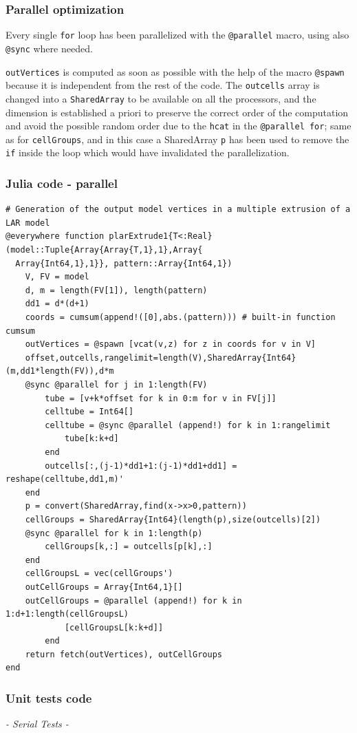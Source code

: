 \documentclass[a4paper,12pt,titlepage]{article}					%
\begin{document}
\subsubsection{Parallel optimization}
Every single \texttt{for} loop has been parallelized with the \texttt{@parallel} macro, using also \texttt{@sync} where needed.

\texttt{outVertices} is computed as soon as possible with the help of the macro \texttt{@spawn} because it is independent from the rest of the code.
The \texttt{outcells} array is changed into a \texttt{SharedArray} to be available on all the processors, and the dimension is established a priori to preserve the correct order of the computation and avoid the possible random order due to the \texttt{hcat} in the \texttt{@parallel for}; same as for \texttt{cellGroups}, and in this case a SharedArray \texttt{p} has been used to remove the \texttt{if} inside the loop which would have invalidated the parallelization.


\subsubsection{Julia code - parallel}
\begin{Verbatim}
# Generation of the output model vertices in a multiple extrusion of a LAR model
@everywhere function plarExtrude1{T<:Real}(model::Tuple{Array{Array{T,1},1},Array{
  Array{Int64,1},1}}, pattern::Array{Int64,1})
	V, FV = model
	d, m = length(FV[1]), length(pattern)
	dd1 = d*(d+1)
	coords = cumsum(append!([0],abs.(pattern))) # built-in function cumsum
	outVertices = @spawn [vcat(v,z) for z in coords for v in V]
	offset,outcells,rangelimit=length(V),SharedArray{Int64}(m,dd1*length(FV)),d*m
	@sync @parallel for j in 1:length(FV)
		tube = [v+k*offset for k in 0:m for v in FV[j]]
		celltube = Int64[]
		celltube = @sync @parallel (append!) for k in 1:rangelimit
			tube[k:k+d]
		end
		outcells[:,(j-1)*dd1+1:(j-1)*dd1+dd1] = reshape(celltube,dd1,m)'
	end
	p = convert(SharedArray,find(x->x>0,pattern))
	cellGroups = SharedArray{Int64}(length(p),size(outcells)[2])
	@sync @parallel for k in 1:length(p)
		cellGroups[k,:] = outcells[p[k],:]
	end
	cellGroupsL = vec(cellGroups')
	outCellGroups = Array{Int64,1}[]
	outCellGroups = @parallel (append!) for k in 1:d+1:length(cellGroupsL)
			[cellGroupsL[k:k+d]]
		end
	return fetch(outVertices), outCellGroups
end
\end{Verbatim}

\subsubsection{Unit tests code}
\emph{- Serial Tests -}
\end{document}
